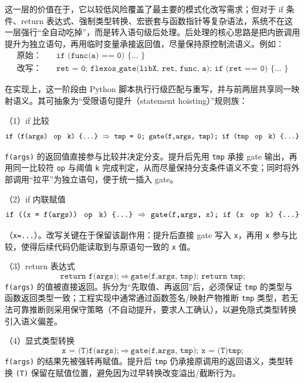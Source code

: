 \documentclass[UTF8,a4paper,12pt,twoside]{ctexart}  %
\begin{document}
这一层的价值在于，它以较低风险覆盖了最主要的模式化改写需求；但对于 if
条件、return
表达式、强制类型转换、宏嵌套与函数指针等复杂语法，系统不在这一层强行``全自动吃掉''，而是转入语句级后处理。后处理的核心思路是把内嵌调用提升为独立语句，再用临时变量承接返回值，尽量保持原控制流语义。例如：
\begin{equation}
  \begin{aligned}
    \text{原始：}\quad & \texttt{if (func(a) == 0) \{ ... \}}                                          \\
    \text{改写：}\quad & \texttt{ret = 0;\ flexos\_gate(libX, ret, func, a);\ if (ret == 0) \{ ... \}}
  \end{aligned}
\end{equation}

在实现上，这一阶段由 Python
脚本执行行级匹配与重写，并与前两层共享同一映射语义。其可抽象为``受限语句提升（statement
hoisting）''规则族：


（1）if 比较
\begin{equation}
  \texttt{if (f(args) \;op\; k) \{...\}}\ \Rightarrow\ \texttt{tmp = 0; gate(f,args, tmp); if (tmp \;op\; k) \{...\}}
\end{equation}

\indent\texttt{f(args)} 的返回值直接参与比较并决定分支。提升后先用 \texttt{tmp} 承接 gate 输出，再用同一比较符 \texttt{op} 与阈值 \texttt{k} 完成判定，从而尽量保持分支条件语义不变；同时将外部调用“拉平”为独立语句，便于统一插入 gate。

（2）if 内联赋值
\begin{equation}
  \texttt{if ((x = f(args)) \;op\; k) \{...\}}\ \Rightarrow\ \texttt{gate(f,args, x); if (x \;op\; k) \{...\}}
\end{equation}

（\texttt{x=...}）。改写关键在于保留该副作用：提升后直接 gate 写入 \texttt{x}，再用 \texttt{x} 参与比较，使得后续代码仍能读取到与原语句一致的 \texttt{x} 值。

（3）return 表达式
\begin{equation}
  \texttt{return f(args);}\ \Rightarrow\ \texttt{gate(f,args, tmp); return tmp;}
\end{equation}
\indent\texttt{f(args)} 的值被直接返回。拆分为“先取值、再返回”后，必须保证 \texttt{tmp} 的类型与函数返回类型一致；工程实现中通常通过函数签名/映射产物推断 \texttt{tmp} 类型，若无法可靠推断则采用保守策略（不自动提升，要求人工确认），以避免隐式类型转换引入语义偏差。

（4）显式类型转换
\begin{equation}
  \texttt{x = (T)f(args);}\ \Rightarrow\ \texttt{gate(f,args, tmp); x = (T)tmp;}
\end{equation}
\indent\texttt{f(args)} 的结果先被强转再赋值。提升后 \texttt{tmp} 仍承接原调用的返回语义，类型转换 \texttt{(T)} 保留在赋值位置，避免因为过早转换改变溢出/截断行为。
\end{document}
